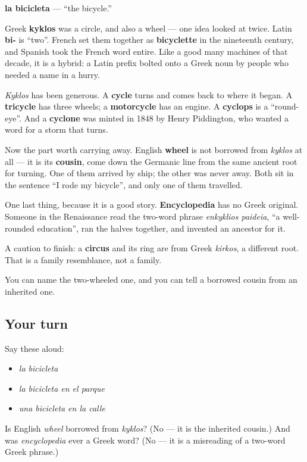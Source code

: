 \begin{cousinweb}
\textbf{la bicicleta} — \textquotedblleft{}the bicycle.\textquotedblright{}

Greek \textbf{kyklos} was a circle, and also a wheel — one idea looked at twice. Latin \textbf{bi-} is \textquotedblleft{}two\textquotedblright{}. French set them together as \textbf{bicyclette} in the nineteenth century, and Spanish took the French word entire. Like a good many machines of that decade, it is a hybrid: a Latin prefix bolted onto a Greek noun by people who needed a name in a hurry.

\emph{Kyklos} has been generous. A \textbf{cycle} turns and comes back to where it began. A \textbf{tricycle} has three wheels; a \textbf{motorcycle} has an engine. A \textbf{cyclops} is a \textquotedblleft{}round-eye\textquotedblright{}. And a \textbf{cyclone} was minted in 1848 by Henry Piddington, who wanted a word for a storm that turns.

Now the part worth carrying away. English \textbf{wheel} is not borrowed from \emph{kyklos} at all — it is its \textbf{cousin}, come down the Germanic line from the same ancient root for turning. One of them arrived by ship; the other was never away. Both sit in the sentence \textquotedblleft{}I rode my bicycle\textquotedblright{}, and only one of them travelled.

One last thing, because it is a good story. \textbf{Encyclopedia} has no Greek original. Someone in the Renaissance read the two-word phrase \emph{enkyklios paideia}, \textquotedblleft{}a well-rounded education\textquotedblright{}, ran the halves together, and invented an ancestor for it.

A caution to finish: a \textbf{circus} and its ring are from Greek \emph{kirkos}, a different root. That is a family resemblance, not a family.
\end{cousinweb}

\begin{grammarlens}[title={What you've built}]
You can name the two-wheeled one, and you can tell a borrowed cousin from an inherited one.
\end{grammarlens}

\subsection*{Your turn}
Say these aloud:

\begin{itemize}
\raggedright
  \item \emph{la bicicleta}
  \item \emph{la bicicleta en el parque}
  \item \emph{una bicicleta en la calle}
\end{itemize}

\begin{tcolorbox}[breakable,colback=teal!4,colframe=teal!35!black,title={Before you move on}]
Is English \emph{wheel} borrowed from \emph{kyklos}? (No — it is the inherited cousin.) And was \emph{encyclopedia} ever a Greek word? (No — it is a misreading of a two-word Greek phrase.)
\end{tcolorbox}
